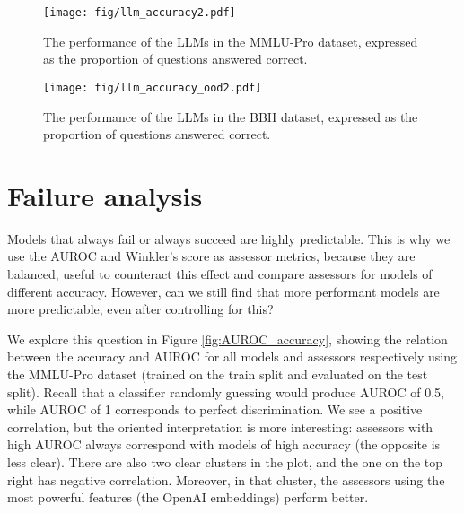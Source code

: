 \documentclass[11pt]{article}
\begin{document}
\begin{figure*}[tb]
    \centering
    \texttt{[image: fig/llm\_accuracy2.pdf]}
    \caption{The performance of the LLMs in the MMLU-Pro dataset, expressed as the proportion of questions answered correct.}
    \label{fig:llm_accuracy}
\end{figure*}

\begin{figure*}[!ht]
    \centering
    \texttt{[image: fig/llm\_accuracy\_ood2.pdf]}
    \caption{The performance of the LLMs in the BBH dataset, expressed as the proportion of questions answered correct.}
    \label{fig:llm_accuracy_ood}
\end{figure*}








\section{Failure analysis}
\label{app:failure}

Models that always fail or always succeed are highly predictable. This is why we use the AUROC and Winkler's score as assessor metrics, because they are balanced, useful to counteract this effect and compare assessors for models of different accuracy. However, can we still find that more performant models are more predictable, even after controlling for this?

We explore this question in Figure \ref{fig:AUROC_accuracy}, showing the relation between the accuracy and AUROC for all models and assessors respectively using the MMLU-Pro dataset (trained on the train split and evaluated on the test split). Recall that a classifier randomly guessing would produce AUROC of 0.5, while AUROC of 1 corresponds to perfect discrimination. We see a positive correlation, but the oriented interpretation is more interesting: assessors with high AUROC always correspond with models of high accuracy (the opposite is less clear). There are also two clear clusters in the plot, and the one on the top right has negative correlation. Moreover, in that cluster, the assessors using the most powerful features (the OpenAI embeddings) perform better.
\end{document}
